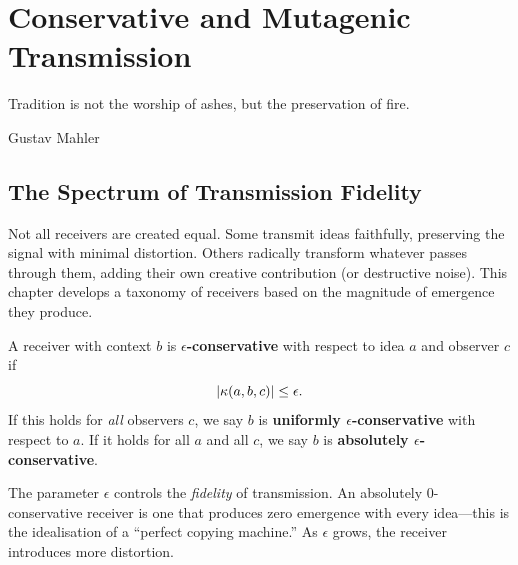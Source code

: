 \chapter{Conservative and Mutagenic Transmission}
\label{ch:conservative}

\epigraph{Tradition is not the worship of ashes, but the preservation of
fire.}{Gustav Mahler}

\section{The Spectrum of Transmission Fidelity}

Not all receivers are created equal.  Some transmit ideas faithfully, preserving
the signal with minimal distortion.  Others radically transform whatever passes
through them, adding their own creative contribution (or destructive noise).
This chapter develops a taxonomy of receivers based on the magnitude of
emergence they produce.

\begin{definition}
\label{def:conservative}
A receiver with context $b$ is \textbf{$\epsilon$-conservative} with respect to
idea $a$ and observer $c$ if
\[
  |\kappa(a, b, c)| \leq \epsilon.
\]
If this holds for \emph{all} observers $c$, we say $b$ is
\textbf{uniformly $\epsilon$-conservative} with respect to $a$.
If it holds for all $a$ and all $c$, we say $b$ is
\textbf{absolutely $\epsilon$-conservative}.
\end{definition}

\begin{remark}
The parameter $\epsilon$ controls the \emph{fidelity} of transmission.  An
absolutely $0$-conservative receiver is one that produces zero emergence with
every idea---this is the idealisation of a ``perfect copying machine.''  As
$\epsilon$ grows, the receiver introduces more distortion.
\end{remark}

